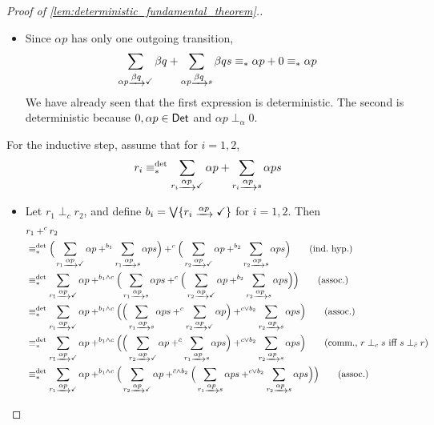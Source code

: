 \documentclass[orivec,envcountsect,envcountsame]{llncs}
\begin{document}
\begin{proof}[Proof of \cref{lem:deterministic_fundamental_theorem}.]
\begin{itemize}
		\item Since \(\alpha p\) has only one outgoing transition,
		\[
			\sum_{\alpha p\tr{\beta q} \checkmark} \beta q + \sum_{\alpha p\tr{\beta q} s} \beta qs
			\equiv_* \alpha p + 0 \equiv_* \alpha p
		\]
		We have already seen that the first expression is deterministic.
		The second is deterministic because \(0,\alpha p \in \mathsf{Det}\) and \(\alpha p \perp_\alpha 0\).
	\end{itemize}
	For the inductive step, assume that for \(i=1,2\),
	\[
	r_i \equiv_*^{\det} \sum_{r_i\tr{\alpha p} \checkmark} \alpha p + \sum_{r_i\tr{\alpha p} s} \alpha ps
	\]
	\begin{itemize}
		\item Let \(r_1 \perp_c r_2\), and define \(b_i = \bigvee \{r_i \tr{\alpha p} \checkmark\}\) for \(i=1,2\).
		Then %
		\begin{align*}
			&r_1 +^c r_2\\
			&\equiv_*^{\det}
			\Big(\sum_{r_1 \tr{\alpha  p} \checkmark} \alpha p
			+^{b_1} \sum_{r_1 \tr{\alpha  p} s} \alpha p s\Big)
			+^c
			\Big(\sum_{r_2 \tr{\alpha  p} \checkmark} \alpha p
			+^{b_2} \sum_{r_2 \tr{\alpha  p} s} \alpha p s\Big)
			\tag{ind.~hyp.}\\
			&\equiv_*^{\det}
			\sum_{r_1 \tr{\alpha  p} \checkmark} \alpha p +^{b_1\wedge c} \Big(\sum_{r_1 \tr{\alpha  p} s} \alpha p s
			+^c
			\Big(\sum_{r_2 \tr{\alpha  p} \checkmark} \alpha p +^{b_2} \sum_{r_2 \tr{\alpha  p} s} \alpha p s\Big)\Big)
			\tag{assoc.}\\
			&\equiv_*^{\det}
			\sum_{r_1 \tr{\alpha  p} \checkmark} \alpha p
			+^{b_1\wedge c} \Big(\Big(\sum_{r_1 \tr{\alpha  p} s} \alpha p s
			+^c \sum_{r_2 \tr{\alpha  p} \checkmark} \alpha p \Big)
			+^{c\vee b_2} \sum_{r_2 \tr{\alpha  p} s} \alpha p s\Big)
			\tag{assoc.}\\
			&\equiv_*^{\det}
			\sum_{r_1 \tr{\alpha  p} \checkmark} \alpha p
			+^{b_1\wedge c} \Big(\Big(\sum_{r_2 \tr{\alpha  p} \checkmark} \alpha p
			+^{\bar c} \sum_{r_1 \tr{\alpha  p} s} \alpha p s \Big)
			+^{c\vee b_2} \sum_{r_2 \tr{\alpha  p} s} \alpha p s\Big)
			\tag{comm., \(r\perp_c s\) iff \(s \perp_{\bar c} r\)}\\
			&\equiv_*^{\det}
			\sum_{r_1 \tr{\alpha  p} \checkmark} \alpha p
			+^{b_1\wedge c} \Big(\sum_{r_2 \tr{\alpha  p} \checkmark} \alpha p
			+^{\bar c \wedge b_2} \Big(\sum_{r_1 \tr{\alpha  p} s} \alpha p s
			+^{c\vee b_2} \sum_{r_2 \tr{\alpha  p} s} \alpha p s\Big)\Big)
			\tag{assoc.}\\

\end{align*}
\end{itemize}
\end{proof}
\end{document}
